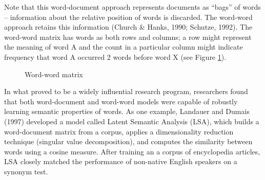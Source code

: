 \documentclass[man,floatsintext]{apa6}
\begin{document}
Note that this word-document approach represents documents as ``bags'' of words -- information about the relative position of words is discarded. The word-word approach retains this information (Church \& Hanks, 1990; Schutze, 1992). The word-word matrix has words as both rows and columns; a row might represent the meaning of word A and the count in a particular column might indicate frequency that word A occurred 2 words before word X (see Figure \ref{matrix-word-word}).

\begin{figure}
  \begin{center} \footnotesize{}
    \caption{Word-word matrix}
    \label{matrix-word-word}
  \end{center}
\end{figure}

In what proved to be a widely influential research program, researchers found that both word-document and word-word models were capable of robustly learning semantic properties of words. As one example, Landauer and Dumais (1997) developed a model called Latent Semantic Analysis (LSA), which builds a word-document matrix from a corpus, applies a dimensionality reduction technique (singular value decomposition), and computes the similarity between words using a cosine measure. After training an a corpus of encyclopedia articles, LSA closely matched the performance of non-native English speakers on a synonym test.
\end{document}

